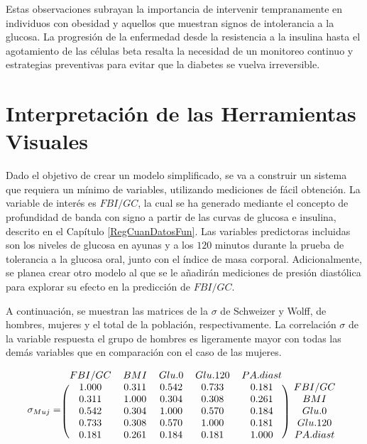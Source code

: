 Estas observaciones subrayan la importancia de intervenir tempranamente en individuos con obesidad y aquellos que muestran signos de intolerancia a la glucosa. La progresión de la enfermedad desde la resistencia a la insulina hasta el agotamiento de las células beta resalta la necesidad de un monitoreo continuo y estrategias preventivas para evitar que la diabetes se vuelva irreversible.


\section{Interpretación de las Herramientas Visuales}

Dado el objetivo de crear un modelo simplificado, se va a construir un sistema que requiera un mínimo de variables, utilizando mediciones de fácil obtención. La variable de interés es $FBI/GC$, la cual se ha generado mediante el concepto de profundidad de banda con signo a partir de las curvas de glucosa e insulina, descrito en el Capítulo \ref{RegCuanDatosFun}. Las variables predictoras incluidas son los niveles de glucosa en ayunas y a los $120$ minutos durante la prueba de tolerancia a la glucosa oral, junto con el índice de masa corporal. Adicionalmente, se planea crear otro modelo al que se le añadirán mediciones de presión diastólica para explorar su efecto en la predicción de $FBI/GC$.

A continuación, se muestran las matrices de la $\sigma$ de Schweizer y Wolff, de hombres, mujeres y el total de la población, respectivamente. La correlación $\sigma$ de la variable respuesta el grupo de hombres es ligeramente mayor con todas las demás variables que en comparación con el caso de las mujeres.

\[
\sigma_{Muj} = \begin{blockarray}{cccccc}
FBI/GC      &      BMI      &    Glu.0      &  Glu.120      & PA.diast \\
\begin{block}{(ccccc)c}
1.000 & 0.311 & 0.542 &  0.733 & 0.181 & FBI/GC \\
0.311 & 1.000 & 0.304 &  0.308 & 0.261 & BMI \\
0.542 & 0.304 & 1.000 &  0.570 & 0.184 & Glu.0 \\
0.733 & 0.308 & 0.570 &  1.000 & 0.181 & Glu.120 \\
0.181 & 0.261 & 0.184 &  0.181 & 1.000 & PA.diast \\
\end{block}
\end{blockarray}
 \]

